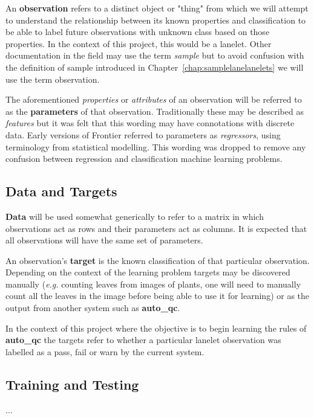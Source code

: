 An \textbf{observation} refers to a distinct object or "thing" from which we
will attempt to understand the relationship between its known properties and
classification to be able to label future observations with unknown class based
on those properties. In the context of this project, this would be a lanelet.
Other documentation in the field may use the term \textit{sample} but to avoid
confusion with the definition of sample introduced in
Chapter~\ref{chap:samplelanelanelets} we will use the term observation.

The aforementioned \textit{properties} or \textit{attributes} of an observation
will be referred to as the \textbf{parameters} of that observation.
Traditionally these may be described as \textit{features} but it was felt that
this wording may have connotations with discrete data. Early versions of
Frontier referred to parameters as \textit{regressors}, using terminology from
statistical modelling. This wording was dropped to remove any confusion between
regression and classification machine learning problems.


\subsection{Data and Targets}

\textbf{Data} will be used somewhat generically to refer to a matrix in which
observations act as rows and their parameters act as columns. It is expected
that all observations will have the same set of parameters.

An observation's \textbf{target} is the known classification of that particular
observation.  Depending on the context of the learning problem targets may be
discovered manually (\textit{e.g.} counting leaves from images of plants, one
will need to manually count all the leaves in the image before being able to use
it for learning) or as the output from another system such as \textbf{auto\_qc}.

In the context of this project where the objective is to begin learning the
rules of \textbf{auto\_qc} the targets refer to whether a particular lanelet
observation was labelled as a pass, fail or warn by the current system.


\subsection{Training and Testing}

...

